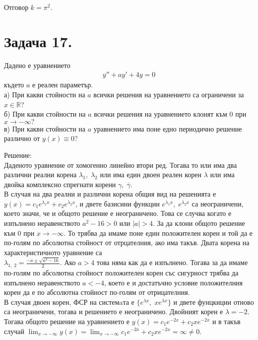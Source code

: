 \documentclass[a4paper, 12pt, oneside]{article}
\newcommand{\R}{\mathbb{R}}
\begin{document}
Отговор $k = \pi^2$.

\section{Задача 17.}
Дадено е уравнението
\begin{align*}
    y'' + ay' + 4y = 0
\end{align*}
където $a$ е реален параметър. \\

а) При какви стойности на $a$ всички решения на уравнението са ограничени
за $x \in \R$? \\

б) При какви стойности на $a$ всички решения на уравнението клонят към $0$
при $x \to -\infty?$ \\

в) При какви стойности на $a$ уравнението има поне едно периодично решение различно
от $y(x) \equiv 0$?

Решение: \\

Даденото уравнение от хомогенно линейно втори ред. Тогава то или има два различни реални корена $\lambda_1, \; \lambda_2$
или има един двоен реален корен $\lambda$ или има двойка комплексно спрегнати корени $\gamma, \; \overline{\gamma}$. \\

В случая на два реални и различни корена общия вид на решенията е $y(x) = c_1e^{\lambda_1x} + c_2e^{\lambda_2x}$,
и двете базисини функции $e^{\lambda_1x}, \; e^{\lambda_2x}$ са неограничени, което значи, че и общото решение е неограничено.
Това се случва когато е изпълнено неравенството $a^2 - 16 > 0$ или $|a| > 4$. За да клони общото решение към $0$ при $x \to -\infty$. 
То трябва да имаме поне един положителен корен и той да е по-голям по абсолютна стойност от отрцателния, ако има такъв.
Двата корена на характеристичното уравнение са \\

$\lambda_{1, \; 2} = \displaystyle\frac{-a \pm \sqrt{a^2 - 16}}{2}$. Ако $a > 4$ това няма как да е изпълнено.
Тогава за да имаме по-голям по абсолютна стойност положителен корен със сигурност трябва да изпълнено неравенството
$a < -4$, което е и достатъчно условие положителния корен да е по абсолютна стойност по-голям от отрицателния. \\

В случая двоен корен, ФСР на системaта е $\{e^{\lambda x}, \; xe^{\lambda x}\}$ и двете
фунцкиции отново са неограничени, тогава и решението е неограничено. Двойният корен е $\lambda = -2$.
Тогава общото решение на уравнението е $y(x) = c_1e^{-2x} + c_2xe^{-2x}$ и в такъв случай
$\displaystyle\lim_{x \to -\infty} y(x) = \displaystyle\lim_{x \to -\infty} c_1e^{-2x} + c_2xe^{-2x} = \infty \neq 0$. \\
\end{document}
